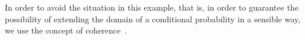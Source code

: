 \documentclass[10pt,a4paper]{paper}
\theoremstyle{definition}
\newcommand{\reals}{\mathbb{R}}
\newcommand{\paths}{\Omega}
\newcommand{\power}{\mathcal{P}(\paths)}
\newcommand{\nonemptypower}{\power_{\emptyset}}
\begin{document}
In order to avoid the situation in this example, that is, in order to guarantee the possibility of extending the domain of a conditional probability in a sensible way, we use the concept of coherence~\cite{berti1991coherent,DeFinetti:oT_PWtAE,regazzini1985finitely,williams1975,Williams:2007eu}.




\end{document}
